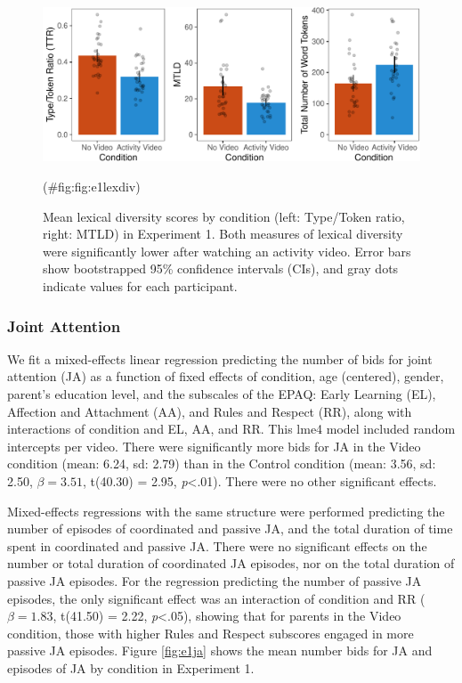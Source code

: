 \documentclass[man,floatsintext]{apa6}
\begin{document}
\begin{figure}[H]

{\centering \includegraphics{figs/fig:e1lexdiv-1} 

}

\caption{Mean lexical diversity scores by condition (left: Type/Token ratio, right: MTLD) in Experiment 1. Both measures of lexical diversity were significantly lower after watching an activity video. Error bars show bootstrapped 95\% confidence intervals (CIs), and gray dots indicate values for each participant.}(\#fig:fig:e1lexdiv)
\end{figure}

\hypertarget{joint-attention}{%
\subsubsection{Joint Attention}\label{joint-attention}}

We fit a mixed-effects linear regression predicting the number of bids for joint attention (JA) as a function of fixed effects of condition, age (centered), gender, parent's education level, and the subscales of the EPAQ: Early Learning (EL), Affection and Attachment (AA), and Rules and Respect (RR), along with interactions of condition and EL, AA, and RR.
This lme4 model included random intercepts per video.
There were significantly more bids for JA in the Video condition (mean: 6.24, sd: 2.79) than in the Control condition (mean: 3.56, sd: 2.50, \(\beta=3.51\), t(40.30) = 2.95, \emph{p}\textless{}.01).
There were no other significant effects.

Mixed-effects regressions with the same structure were performed predicting the number of episodes of coordinated and passive JA, and the total duration of time spent in coordinated and passive JA.
There were no significant effects on the number or total duration of coordinated JA episodes, nor on the total duration of passive JA episodes.
For the regression predicting the number of passive JA episodes, the only significant effect was an interaction of condition and RR (\(\beta=1.83\), t(41.50) = 2.22, \emph{p}\textless{}.05), showing that for parents in the Video condition, those with higher Rules and Respect subscores engaged in more passive JA episodes.
Figure \ref{fig:e1ja} shows the mean number bids for JA and episodes of JA by condition in Experiment 1.
\end{document}
